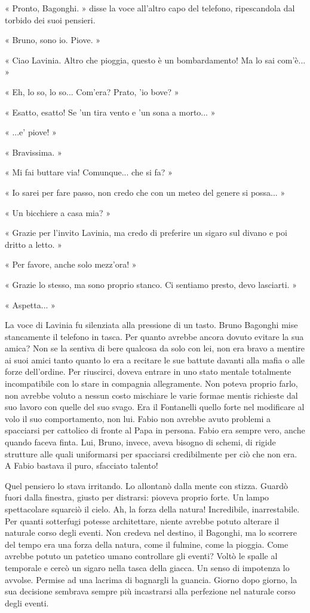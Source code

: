 « Pronto, Bagonghi. » disse la voce all'altro capo del telefono, ripescandola dal torbido dei suoi pensieri.

« Bruno, sono io. Piove. »

« Ciao Lavinia. Altro che pioggia, questo è un bombardamento! Ma lo sai com'è... »

« Eh, lo so, lo so... Com'era? Prato, 'io bove? »

« Esatto, esatto! Se 'un tira vento e 'un sona a morto... »

« ...e' piove! »

« Bravissima. »

« Mi fai buttare via! Comunque... che si fa? »

« Io sarei per fare passo, non credo che con un meteo del genere si possa... »

« Un bicchiere a casa mia? »

« Grazie per l'invito Lavinia, ma credo di preferire un sigaro sul divano e poi dritto a letto. »

« Per favore, anche solo mezz'ora! »

« Grazie lo stesso, ma sono proprio stanco. Ci sentiamo presto, devo lasciarti. »

« Aspetta... »

La voce di Lavinia fu silenziata alla pressione di un tasto. Bruno Bagonghi mise stancamente il telefono in tasca. Per quanto avrebbe ancora dovuto evitare la sua amica? Non se la sentiva di bere qualcosa da solo con lei, non era bravo a mentire ai suoi amici tanto quanto lo era a recitare le sue battute davanti alla mafia o alle forze dell'ordine. Per riuscirci, doveva entrare in uno stato mentale totalmente incompatibile con lo stare in compagnia allegramente. Non poteva proprio farlo, non avrebbe voluto a nessun costo mischiare le varie formae mentis richieste dal suo lavoro con quelle del suo svago. Era il Fontanelli quello forte nel modificare al volo il suo comportamento, non lui. Fabio non avrebbe avuto problemi a spacciarsi per cattolico di fronte al Papa in persona. Fabio era sempre vero, anche quando faceva finta. Lui, Bruno, invece, aveva bisogno di schemi, di rigide strutture alle quali uniformarsi per spacciarsi credibilmente per ciò che non era. A Fabio bastava il puro, sfacciato talento!

Quel pensiero lo stava irritando. Lo allontanò dalla mente con stizza. Guardò fuori dalla finestra, giusto per distrarsi: pioveva proprio forte. Un lampo spettacolare squarciò il cielo. Ah, la forza della natura! Incredibile, inarrestabile. Per quanti sotterfugi potesse architettare, niente avrebbe potuto alterare il naturale corso degli eventi. Non credeva nel destino, il Bagonghi, ma lo scorrere del tempo era una forza della natura, come il fulmine, come la pioggia. Come avrebbe potuto un patetico umano controllare gli eventi? Voltò le spalle al temporale e cercò un sigaro nella tasca della giacca. Un senso di impotenza lo avvolse. Permise ad una lacrima di bagnargli la guancia. Giorno dopo giorno, la sua decisione sembrava sempre più incastrarsi alla perfezione nel naturale corso degli eventi.

